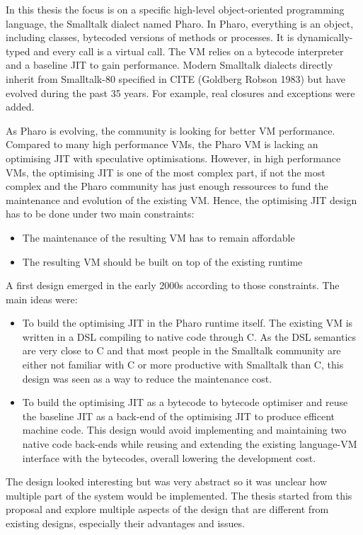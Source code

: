\documentclass[a4paper,12pt,twoside]{../includes/ThesisStyle}
\begin{document}
In this thesis the focus is on a specific high-level object-oriented programming language, the Smalltalk dialect named Pharo. In Pharo, everything is an object, including classes, bytecoded versions of methods or processes. It is dynamically-typed and every call is a virtual call. The VM relies on a bytecode interpreter and a baseline JIT to gain performance. Modern Smalltalk dialects directly inherit from Smalltalk-80 specified in CITE (Goldberg  Robson 1983) but have evolved during the past 35 years. For example, real closures and exceptions were added.

As Pharo is evolving, the community is looking for better VM performance. Compared to many high performance VMs, the Pharo VM is lacking an optimising JIT with speculative optimisations. However, in high performance VMs, the optimising JIT is one of the most complex part, if not the most complex and the Pharo community has just enough ressources to fund the maintenance and evolution of the existing VM. Hence, the optimising JIT design has to be done under two main constraints:
\begin{itemize}
\item The maintenance of the resulting VM has to remain affordable
\item The resulting VM should be built on top of the existing runtime
\end{itemize}

A first design emerged in the early 2000s according to those constraints. The main ideas were:
\begin{itemize}
	\item To build the optimising JIT in the Pharo runtime itself. The existing VM is written in a DSL compiling to native code through C. As the DSL semantics are very close to C and that most people in the Smalltalk community are either not familiar with C or more productive with Smalltalk than C, this design was seen as a way to reduce the maintenance cost.
	\item To build the optimising JIT as a bytecode to bytecode optimiser and reuse the baseline JIT as a back-end of the optimising JIT to produce efficent machine code. This design would avoid implementing and maintaining two native code back-ends while reusing and extending the existing language-VM interface with the bytecodes, overall lowering the development cost.
\end{itemize}

The design looked interesting but was very abstract so it was unclear how multiple part of the system would be implemented. The thesis started from this proposal and explore multiple aspects of the design that are different from existing designs, especially their advantages and issues.
\end{document}
